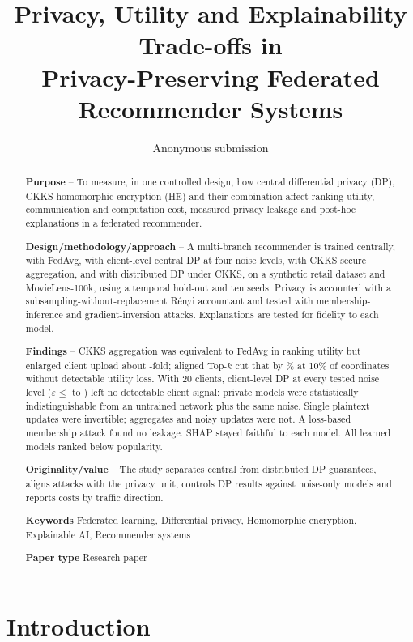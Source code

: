 \documentclass[11pt,a4paper]{article}
\title{\textbf{Privacy, Utility and Explainability Trade-offs in\\ Privacy-Preserving Federated Recommender Systems}}
\author{Anonymous submission}
\date{}
\begin{document}
\maketitle

\begin{abstract}
\noindent\textbf{Purpose} -- To measure, in one controlled design, how central differential privacy (DP), CKKS homomorphic encryption (HE) and their combination affect ranking utility, communication and computation cost, measured privacy leakage and post-hoc explanations in a federated recommender.

\noindent\textbf{Design/methodology/approach} -- A multi-branch recommender is trained centrally, with FedAvg, with client-level central DP at four noise levels, with CKKS secure aggregation, and with distributed DP under CKKS, on a synthetic retail dataset and MovieLens-100k, using a temporal hold-out and ten seeds. Privacy is accounted with a subsampling-without-replacement R\'enyi accountant and tested with membership-inference and gradient-inversion attacks. Explanations are tested for fidelity to each model.

\noindent\textbf{Findings} -- CKKS aggregation was equivalent to FedAvg in ranking utility but enlarged client upload about -fold; aligned Top-$k$ cut that by \% at 10\% of coordinates without detectable utility loss. With 20 clients, client-level DP at every tested noise level ($\varepsilon \leq$  to ) left no detectable client signal: private models were statistically indistinguishable from an untrained network plus the same noise. Single plaintext updates were invertible; aggregates and noisy updates were not. A loss-based membership attack found no leakage. SHAP stayed faithful to each model. All learned models ranked below popularity.

\noindent\textbf{Originality/value} -- The study separates central from distributed DP guarantees, aligns attacks with the privacy unit, controls DP results against noise-only models and reports costs by traffic direction.

\noindent\textbf{Keywords} Federated learning, Differential privacy, Homomorphic encryption, Explainable AI, Recommender systems

\noindent\textbf{Paper type} Research paper
\end{abstract}

\section{Introduction}
\end{document}
